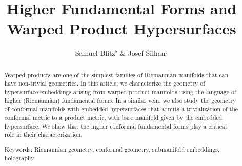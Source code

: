 \documentclass[a4paper,10.9pt]{amsart}
\theoremstyle{definition}
\theoremstyle{remark}
\numberwithin{equation}{section}
\renewcommand{\=}{\stackrel \Sigma =}
\begin{document}

\renewcommand{\today}{}
\title{
{Higher Fundamental Forms and Warped Product Hypersurfaces
}}
%
%  
%  

\author{ Samuel Blitz${}^\flat$ \& Josef \v{S}ilhan${}^\sharp$}

\address{${}^\flat$
 Department of Mathematics and Statistics \\
 Masaryk University\\
 Building 08, Kotl\'a\v{r}sk\'a 2 \\
 Brno, CZ 61137} 

\address{${}^\sharp$
 Department of Mathematics and Statistics \\
 Masaryk University\\
 Building 08, Kotl\'a\v{r}sk\'a 2 \\
 Brno, CZ 61137} 
 
\vspace{10pt}

\begin{abstract}
Warped products are one of the simplest families of Riemannian manifolds that can have non-trivial geometries. In this article, we characterize the geometry of hypersurface embeddings arising from warped product manifolds using the language of higher (Riemannian) fundamental forms. In a similar vein, we also study the geometry of conformal manifolds with embedded hypersurfaces that admits a trivialization of the conformal metric to a product metric, with base manifold given by the embedded hypersurface. We show that the higher conformal fundamental forms play a critical role in their characterization.

\vspace{0.5cm}

\noindent
{\sf \tiny Keywords: 
Riemannian geometry, conformal geometry, submanifold embeddings, holography}

\vspace{2cm}

\end{abstract}
\end{document}
